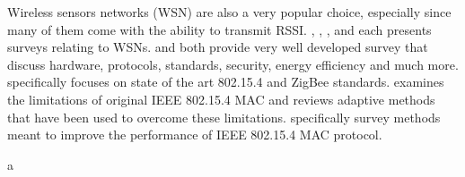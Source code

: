 \documentclass[conference]{IEEEtran}
\begin{document}
	Wireless sensors networks (WSN) are also a very popular choice, especially since many of them come with the ability to transmit RSSI. \cite{Baronti2007}, \cite{Khanafer2014}, \cite{Akyildiz2002}, and \cite{Xia2011} each presents surveys relating to WSNs.  \cite{Baronti2007} and \cite{Akyildiz2002} both provide very well developed survey that discuss hardware, protocols, standards, security, energy efficiency and much more. \cite{Baronti2007} specifically focuses on state of the art 802.15.4 and ZigBee standards. \cite{Xia2011} examines the limitations of original IEEE 802.15.4 MAC and reviews adaptive methods that have been used to overcome these limitations. \cite{Khanafer2014} specifically survey methods meant to improve the performance of IEEE 802.15.4 MAC protocol.




	
	
	
	
	a%
	
	
	
	

	
	


	
\end{document}
